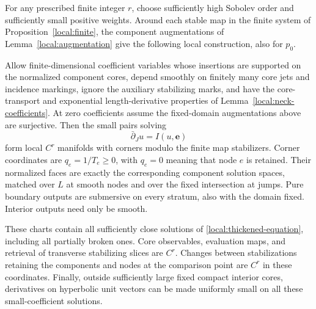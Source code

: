 \begin{proposition}\label{local:charts}
For any prescribed finite integer $r$, choose sufficiently high Sobolev
order and sufficiently small positive weights.  Around each stable
map in the finite system of Proposition~\ref{local:finite}, the
component augmentations of Lemma~\ref{local:augmentation} give the
following local construction, also for $p_0$.

Allow finite-dimensional coefficient variables whose insertions are
supported on the normalized component cores, depend smoothly on
finitely many core jets and incidence markings, ignore the auxiliary
stabilizing marks, and have the core-transport and exponential
length-derivative properties of Lemma~\ref{local:neck-coefficients}.
At zero coefficients assume the fixed-domain augmentations above
are surjective.  Then the small pairs solving
\begin{equation}\label{local:thickened-equation}
 \bar\partial_Ju=I(u,\mathbf e)
\end{equation}
form local $C^r$ manifolds with corners modulo the finite map
stabilizers.  Corner coordinates are $q_e=1/T_e\geq0$, with $q_e=0$
meaning that node $e$ is retained.  Their normalized faces are exactly
the corresponding component solution spaces, matched over $L$ at
smooth nodes and over the fixed intersection at jumps.  Pure boundary
outputs are submersive on every stratum, also with the domain fixed.
Interior outputs need only be smooth.

These charts contain all sufficiently close solutions of
\eqref{local:thickened-equation}, including all partially broken ones.
Core observables, evaluation maps, and retrieval of transverse
stabilizing slices are $C^r$.  Changes between stabilizations retaining
the components and nodes at the comparison point are $C^r$ in these
coordinates.  Finally, outside sufficiently large fixed compact
interior cores, derivatives on hyperbolic unit vectors can be made
uniformly small on all these small-coefficient solutions.
\end{proposition}
